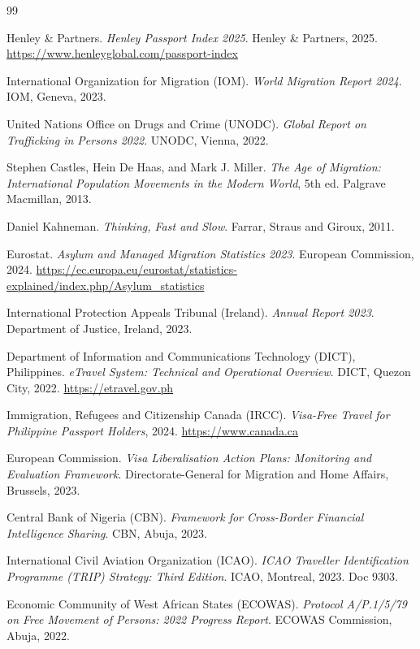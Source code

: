 \documentclass[11pt]{article}
\begin{document}
\begin{thebibliography}{99}

Henley \& Partners.
\newblock \textit{Henley Passport Index 2025}.
\newblock Henley \& Partners, 2025.
\newblock \url{https://www.henleyglobal.com/passport-index}

International Organization for Migration (IOM).
\newblock \textit{World Migration Report 2024}.
\newblock IOM, Geneva, 2023.

United Nations Office on Drugs and Crime (UNODC).
\newblock \textit{Global Report on Trafficking in Persons 2022}.
\newblock UNODC, Vienna, 2022.

Stephen Castles, Hein De Haas, and Mark J. Miller.
\newblock \textit{The Age of Migration: International Population Movements
in the Modern World}, 5th ed.
\newblock Palgrave Macmillan, 2013.

Daniel Kahneman.
\newblock \textit{Thinking, Fast and Slow}.
\newblock Farrar, Straus and Giroux, 2011.

Eurostat.
\newblock \textit{Asylum and Managed Migration Statistics 2023}.
\newblock European Commission, 2024.
\newblock \url{https://ec.europa.eu/eurostat/statistics-explained/index.php/Asylum_statistics}

International Protection Appeals Tribunal (Ireland).
\newblock \textit{Annual Report 2023}.
\newblock Department of Justice, Ireland, 2023.

Department of Information and Communications Technology (DICT), Philippines.
\newblock \textit{eTravel System: Technical and Operational Overview}.
\newblock DICT, Quezon City, 2022.
\newblock \url{https://etravel.gov.ph}

Immigration, Refugees and Citizenship Canada (IRCC).
\newblock \textit{Visa-Free Travel for Philippine Passport Holders}, 2024.
\newblock \url{https://www.canada.ca}

European Commission.
\newblock \textit{Visa Liberalisation Action Plans: Monitoring and Evaluation
Framework}.
\newblock Directorate-General for Migration and Home Affairs, Brussels, 2023.

Central Bank of Nigeria (CBN).
\newblock \textit{Framework for Cross-Border Financial Intelligence Sharing}.
\newblock CBN, Abuja, 2023.

International Civil Aviation Organization (ICAO).
\newblock \textit{ICAO Traveller Identification Programme (TRIP) Strategy:
Third Edition}.
\newblock ICAO, Montreal, 2023.
\newblock Doc 9303.

Economic Community of West African States (ECOWAS).
\newblock \textit{Protocol A/P.1/5/79 on Free Movement of Persons:
2022 Progress Report}.
\newblock ECOWAS Commission, Abuja, 2022.

\end{thebibliography}
\end{document}
